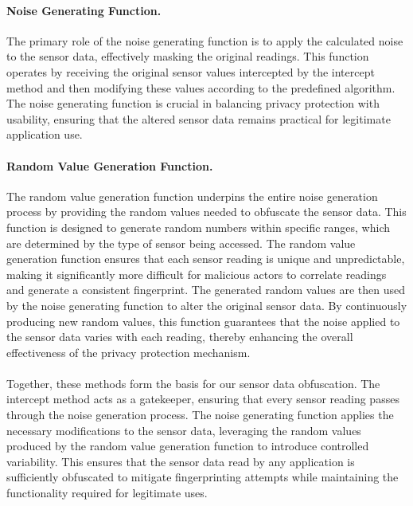 \documentclass[11pt,
  oneside,openany,    %
]{scrreprt}
\begin{document}
\paragraph{Noise Generating Function.}
\label{par:noise_gen_func}
The primary role of the noise generating function is to apply the calculated noise to the sensor data, effectively masking the original readings.
This function operates by receiving the original sensor values intercepted by the intercept method and then modifying these values according to the predefined algorithm. 
The noise generating function is crucial in balancing privacy protection with usability, ensuring that the altered sensor data remains practical for legitimate application use.

\paragraph{Random Value Generation Function.}
\label{par:random_vale_gen_func}
The random value generation function underpins the entire noise generation process by providing the random values needed to obfuscate the sensor data.
This function is designed to generate random numbers within specific ranges, which are determined by the type of sensor being accessed.
The random value generation function ensures that each sensor reading is unique and unpredictable, making it significantly more difficult for malicious actors to correlate readings and generate a consistent fingerprint.
The generated random values are then used by the noise generating function to alter the original sensor data.
By continuously producing new random values, this function guarantees that the noise applied to the sensor data varies with each reading, thereby enhancing the overall effectiveness of the privacy protection mechanism.

\paragraph{}
Together, these methods form the basis for our sensor data obfuscation. 
The intercept method acts as a gatekeeper, ensuring that every sensor reading passes through the noise generation process.
The noise generating function applies the necessary modifications to the sensor data, leveraging the random values produced by the random value generation function to introduce controlled variability.
This ensures that the sensor data read by any application is sufficiently obfuscated to mitigate fingerprinting attempts while maintaining the functionality required for legitimate uses.
\end{document}
